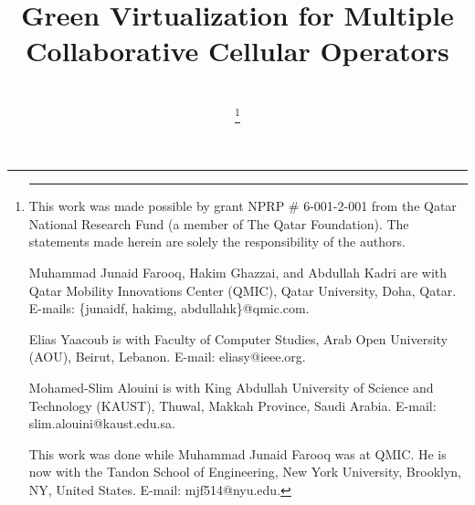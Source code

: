 \documentclass[10pt, letter, twocolumn]{IEEEtran}
\begin{document}
\title{
Green Virtualization for Multiple Collaborative Cellular Operators
}
\author{\\
\vspace{-0.2cm}
\thanks{\hrule \vspace{0.2cm}
This work was made possible by grant NPRP \# 6-001-2-001 from the Qatar National Research Fund (a member of The Qatar Foundation). The statements made herein are solely the responsibility of the authors.

Muhammad Junaid Farooq, Hakim Ghazzai, and Abdullah Kadri are with Qatar Mobility Innovations Center (QMIC), Qatar University, Doha, Qatar. E-mails: \{junaidf, hakimg, abdullahk\}@qmic.com.

Elias Yaacoub is with Faculty of Computer Studies, Arab Open University (AOU), Beirut, Lebanon. E-mail: eliasy@ieee.org.

Mohamed-Slim Alouini is with King Abdullah University of Science and Technology (KAUST), Thuwal, Makkah Province, Saudi Arabia. E-mail: slim.alouini@kaust.edu.sa.

This work was done while Muhammad Junaid Farooq was at QMIC. He is now with the Tandon School of Engineering, New York University, Brooklyn, NY, United States. E-mail: mjf514@nyu.edu.
}}


\maketitle
\thispagestyle{empty}
\end{document}
